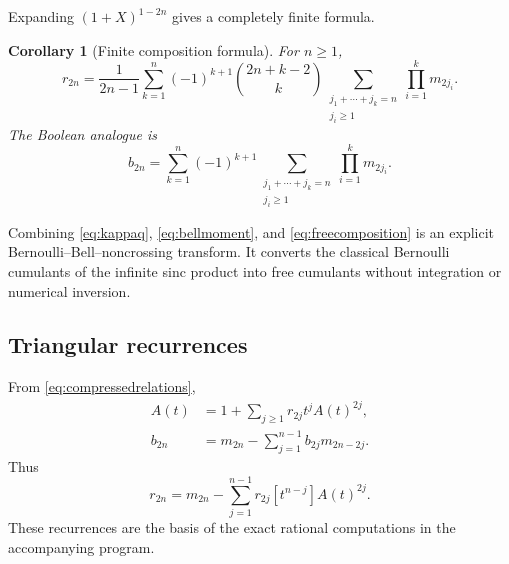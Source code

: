 \documentclass[11pt,oneside]{article}
\newtheorem{corollary}[theorem]{Corollary}
\theoremstyle{definition}
\theoremstyle{remark}
\begin{document}
Expanding \((1+X)^{1-2n}\) gives a completely finite formula.
\begin{corollary}[Finite composition formula]\label{cor:compositionfree}
For \(n\ge1\),
\begin{equation}\label{eq:freecomposition}
r_{2n}=\frac1{2n-1}\sum_{k=1}^n(-1)^{k+1}
\binom{2n+k-2}{k}
\sum_{\substack{j_1+\cdots+j_k=n\\j_i\ge1}}
\prod_{i=1}^k m_{2j_i}.
\end{equation}
The Boolean analogue is
\begin{equation}\label{eq:booleancomposition}
b_{2n}=\sum_{k=1}^n(-1)^{k+1}
\sum_{\substack{j_1+\cdots+j_k=n\\j_i\ge1}}
\prod_{i=1}^k m_{2j_i}.
\end{equation}
\end{corollary}

Combining \eqref{eq:kappaq}, \eqref{eq:bellmoment}, and \eqref{eq:freecomposition} is an explicit Bernoulli--Bell--noncrossing transform. It converts the classical Bernoulli cumulants of the infinite sinc product into free cumulants without integration or numerical inversion.

\subsection{Triangular recurrences}
From \eqref{eq:compressedrelations},
\begin{align}
A(t)&=1+\sum_{j\ge1}r_{2j}t^jA(t)^{2j},\label{eq:freerecgen}\\
b_{2n}&=m_{2n}-\sum_{j=1}^{n-1}b_{2j}m_{2n-2j}.
\label{eq:booleanrec}
\end{align}
Thus
\begin{equation}\label{eq:freerec}
r_{2n}=m_{2n}-\sum_{j=1}^{n-1}r_{2j}[t^{n-j}]A(t)^{2j}.
\end{equation}
These recurrences are the basis of the exact rational computations in the accompanying program.
\end{document}

